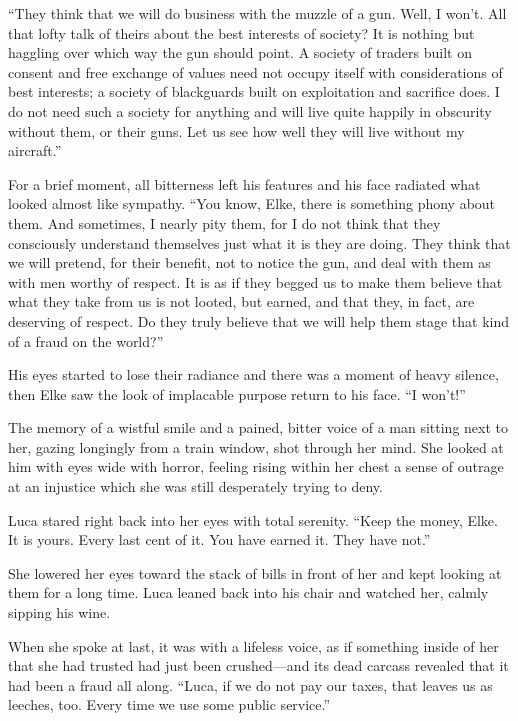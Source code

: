 ``They think that we will do business with the muzzle of a gun. Well, I won't. All that lofty talk of theirs about the best interests of society? It is nothing but haggling over which way the gun should point. A society of traders built on consent and free exchange of values need not occupy itself with considerations of best interests; a society of blackguards built on exploitation and sacrifice does. I do not need such a society for anything and will live quite happily in obscurity without them, or their guns. Let us see how well they will live without my aircraft.''

For a brief moment, all bitterness left his features and his face radiated what looked almost like sympathy. ``You know, Elke, there is something phony about them. And sometimes, I nearly pity them, for I do not think that they consciously understand themselves just what it is they are doing. They think that we will pretend, for their benefit, not to notice the gun, and deal with them as with men worthy of respect. It is as if they begged us to make them believe that what they take from us is not looted, but earned, and that they, in fact, are deserving of respect. Do they truly believe that we will help them stage that kind of a fraud on the world?''

His eyes started to lose their radiance and there was a moment of heavy silence, then Elke saw the look of implacable purpose return to his face. ``I won't!''

The memory of a wistful smile and a pained, bitter voice of a man sitting next to her, gazing longingly from a train window, shot through her mind. She looked at him with eyes wide with horror, feeling rising within her chest a sense of outrage at an injustice which she was still desperately trying to deny.

Luca stared right back into her eyes with total serenity. ``Keep the money, Elke. It is yours. Every last cent of it. You have earned it. They have not.''

She lowered her eyes toward the stack of bills in front of her and kept looking at them for a long time. Luca leaned back into his chair and watched her, calmly sipping his wine.

When she spoke at last, it was with a lifeless voice, as if something inside of her that she had trusted had just been crushed---and its dead carcass revealed that it had been a fraud all along. ``Luca, if we do not pay our taxes, that leaves us as leeches, too. Every time we use some public service.''

